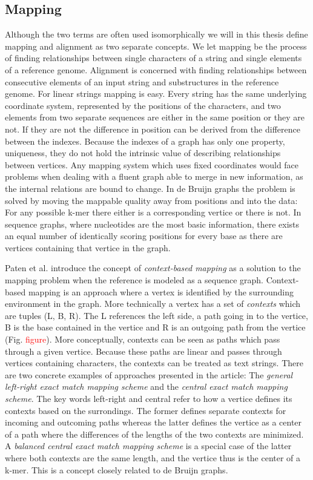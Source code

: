 \documentclass[thesis.tex]{subfiles}
\begin{document}
\subsection{Mapping}
Although the two terms are often used isomorphically we will in this thesis define mapping and alignment as two separate concepts. We let mapping be the process of finding relationships between single characters of a string and single elements of a reference genome. Alignment is concerned with finding relationships between consecutive elements of an input string and substructures in the reference genome. For linear strings mapping is easy. Every string has the same underlying coordinate system, represented by the positions of the characters, and two elements from two separate sequences are either in the same position or they are not. If they are not the difference in position can be derived from the difference between the indexes. Because the indexes of a graph has only one property, uniqueness, they do not hold the intrinsic value of describing relationships between vertices. Any mapping system which uses fixed coordinates would face problems when dealing with a fluent graph able to merge in new information, as the internal relations are bound to change. In de Bruijn graphs the problem is solved by moving the mappable quality away from positions and into the data: For any possible k-mer there either is a corresponding vertice or there is not. In sequence graphs, where nucleotides are the most basic information, there exists an equal number of identically scoring positions for every base as there are vertices containing that vertice in the graph.\\
\par\noindent
Paten et al.\cite{mapping_to_a_reference_genome_structure} introduce the concept of \textit{context-based mapping} as a solution to the mapping problem when the reference is modeled as a sequence graph. Context-based mapping is an approach where a vertex is identified by the surrounding environment in the graph. More technically a vertex has a set of \textit{contexts} which are tuples (L, B, R). The L references the left side, a path going in to the vertice, B is the base contained in the vertice and R is an outgoing path from the vertice (Fig. \textcolor{red}{figure}). More conceptually, contexts can be seen as paths which pass through a given vertice. Because these paths are linear and passes through vertices containing characters, the contexts can be treated as text strings. There are two concrete examples of approaches presented in the article: The \textit{general left-right exact match mapping scheme} and the \textit{central exact match mapping scheme}. The key words left-right and central refer to how a vertice defines its contexts based on the surrondings. The former defines separate contexts for incoming and outcoming paths whereas the latter defines the vertice as a center of a path where the differences of the lengths of the two contexts are minimized. A  \textit{balanced central exact match mapping scheme} is a special case of the latter where both contexts are the same length, and the vertice thus is the center of a k-mer. This is a concept closely related to de Bruijn graphs.\\
\end{document}
